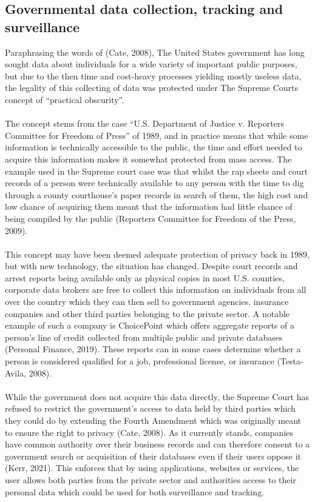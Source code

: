 \documentclass[11pt]{article}
\begin{document}
\subsection{Governmental data collection, tracking and surveillance}
Paraphrasing the words of (Cate, 2008), The United States government has long sought data about individuals for a wide variety of important public purposes, but due to the then time and cost-heavy processes yielding mostly useless data, the legality of this collecting of data was protected under The Supreme Courts concept of “practical obscurity”. 
\\ \\
The concept stems from the case “U.S. Department of Justice v. Reporters Committee for Freedom of Press” of 1989, and in practice means that while some information is technically accessible to the public, the time and effort needed to acquire this information makes it somewhat protected from mass access. The example used in the Supreme court case was that whilst the rap sheets and court records of a person were technically available to any person with the time to dig through a county courthouse’s paper records in search of them, the high cost and low chance of acquiring them meant that the information had little chance of being compiled by the public (Reporters Committee for Freedom of the Press, 2009). 
\\ \\
This concept may have been deemed adequate protection of privacy back in 1989, but with new technology, the situation has changed. Despite court records and arrest reports being available only as physical copies in most U.S. counties, corporate data brokers are free to collect this information on individuals from all over the country which they can then sell to government agencies, insurance companies and other third parties belonging to the private sector. A notable example of such a company is ChoicePoint which offers aggregate reports of a person’s line of credit collected from multiple public and private databases (Personal Finance, 2019). These reports can in some cases determine whether a person is considered qualified for a job, professional license, or insurance (Testa-Avila, 2008).
\\ \\
While the government does not acquire this data directly, the Supreme Court has refused to restrict the government’s access to data held by third parties which they could do by extending the Fourth Amendment which was originally meant to ensure the right to privacy (Cate, 2008). As it currently stands, companies have common authority over their business records and can therefore consent to a government search or acquisition of their databases even if their users oppose it (Kerr, 2021).
This enforces that by using applications, websites or services, the user allows both parties from the private sector and authorities access to their personal data which could be used for both surveillance and tracking.
\\
\end{document}

